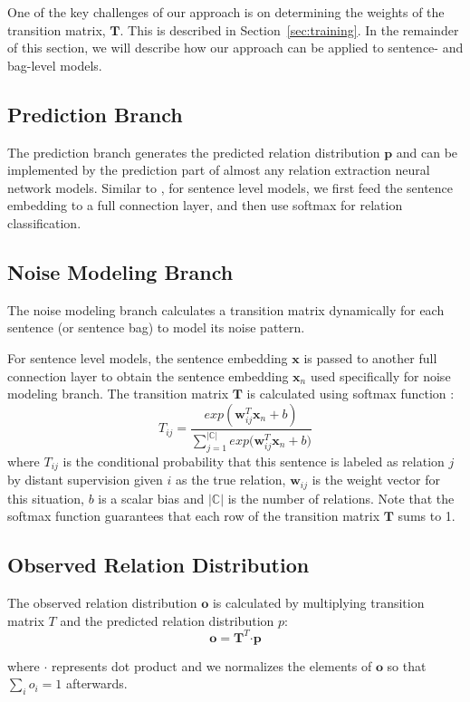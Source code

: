 One of the key challenges of our approach is
on determining the weights of the transition matrix, $\mathbf{T}$. This is described in Section~\ref{sec:training}.
In the remainder of this section, we will describe how our approach can be
applied to sentence- and bag-level models. 



\subsection{Prediction Branch}
The prediction branch generates the predicted relation distribution $\mathbf{p}$ and can be implemented by the
prediction part of almost any relation extraction neural network models. Similar to \cite{luo2016temporal}, for
sentence level models, we first feed the sentence embedding to a full connection layer, and then use softmax for
relation classification.

\subsection{Noise Modeling Branch}
The noise modeling branch calculates a transition matrix dynamically for each sentence (or sentence bag) to model its noise pattern.

For sentence level models, the sentence embedding $\mathbf{x}$ is passed to another full connection layer to obtain the sentence embedding $\mathbf{x}_n$ used specifically for noise modeling branch. The transition matrix $\mathbf{T}$ is calculated using softmax function :
\begin{equation}
T_{ij} = \frac{exp({\mathbf{w}_{ij}^T \mathbf{x}_n + b})}{\sum_{j=1}^{|\mathbb{C}|}{exp({\mathbf{w}_{ij}^T \mathbf{x}_n + b}})}
\end{equation}
where $T_{ij}$ is the conditional probability that this sentence is labeled as relation $j$ by distant supervision given $i$ as the true relation, $\mathbf{w}_{ij}$ is the weight vector for this situation, $b$ is a scalar bias and $|\mathbb{C}|$ is the number of relations. Note that the softmax function guarantees that each row of the transition matrix $\mathbf{T}$ sums to 1.

\subsection{Observed Relation Distribution}
The observed relation distribution $\mathbf{o}$ is calculated by multiplying transition matrix $T$ and the predicted relation distribution $p$:
 \begin{equation}
\mathbf{o} = \mathbf{T}^T \bm\cdot \mathbf{p}
\label{eq_transition}
 \end{equation}

 where $\bm\cdot$ represents dot product and we normalizes the elements of $\mathbf{o}$ so that $\sum_i{o_i}=1$ afterwards.

